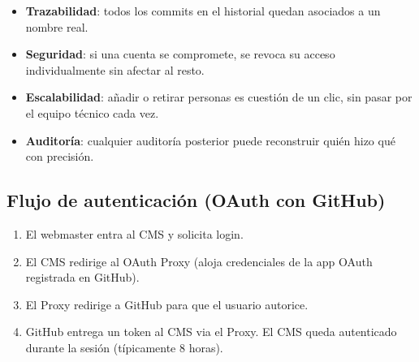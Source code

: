 \documentclass[11pt,a4paper]{article}
\begin{document}
\begin{itemize}[leftmargin=*]
  \item \textbf{Trazabilidad}: todos los commits en el historial quedan asociados a un nombre real.
  \item \textbf{Seguridad}: si una cuenta se compromete, se revoca su acceso individualmente sin afectar al resto.
  \item \textbf{Escalabilidad}: añadir o retirar personas es cuestión de un clic, sin pasar por el equipo técnico cada vez.
  \item \textbf{Auditoría}: cualquier auditoría posterior puede reconstruir quién hizo qué con precisión.
\end{itemize}

\subsection{Flujo de autenticación (OAuth con GitHub)}

\begin{center}
\end{center}

\begin{enumerate}[leftmargin=*]
  \item El webmaster entra al CMS y solicita login.
  \item El CMS redirige al OAuth Proxy (aloja credenciales de la app OAuth registrada en GitHub).
  \item El Proxy redirige a GitHub para que el usuario autorice.
  \item GitHub entrega un token al CMS via el Proxy. El CMS queda autenticado durante la sesión (típicamente 8 horas).
\end{enumerate}
\end{document}
